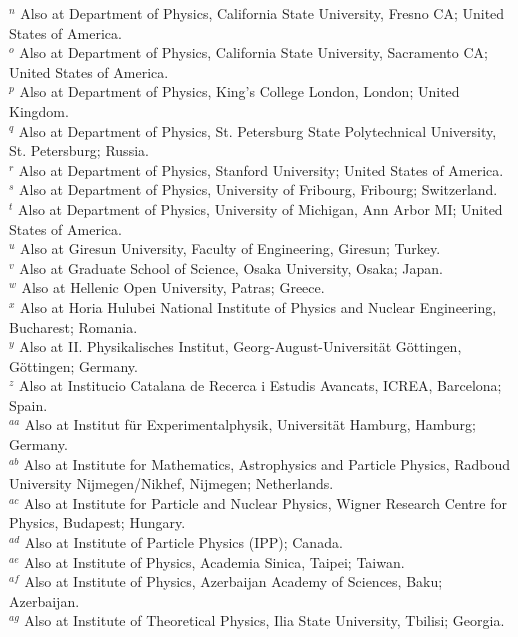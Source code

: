 \begin{flushleft}
$^{n}$ Also at Department of Physics, California State University, Fresno CA; United States of America.\\
$^{o}$ Also at Department of Physics, California State University, Sacramento CA; United States of America.\\
$^{p}$ Also at Department of Physics, King's College London, London; United Kingdom.\\
$^{q}$ Also at Department of Physics, St. Petersburg State Polytechnical University, St. Petersburg; Russia.\\
$^{r}$ Also at Department of Physics, Stanford University; United States of America.\\
$^{s}$ Also at Department of Physics, University of Fribourg, Fribourg; Switzerland.\\
$^{t}$ Also at Department of Physics, University of Michigan, Ann Arbor MI; United States of America.\\
$^{u}$ Also at Giresun University, Faculty of Engineering, Giresun; Turkey.\\
$^{v}$ Also at Graduate School of Science, Osaka University, Osaka; Japan.\\
$^{w}$ Also at Hellenic Open University, Patras; Greece.\\
$^{x}$ Also at Horia Hulubei National Institute of Physics and Nuclear Engineering, Bucharest; Romania.\\
$^{y}$ Also at II. Physikalisches Institut, Georg-August-Universit\"{a}t G\"ottingen, G\"ottingen; Germany.\\
$^{z}$ Also at Institucio Catalana de Recerca i Estudis Avancats, ICREA, Barcelona; Spain.\\
$^{aa}$ Also at Institut f\"{u}r Experimentalphysik, Universit\"{a}t Hamburg, Hamburg; Germany.\\
$^{ab}$ Also at Institute for Mathematics, Astrophysics and Particle Physics, Radboud University Nijmegen/Nikhef, Nijmegen; Netherlands.\\
$^{ac}$ Also at Institute for Particle and Nuclear Physics, Wigner Research Centre for Physics, Budapest; Hungary.\\
$^{ad}$ Also at Institute of Particle Physics (IPP); Canada.\\
$^{ae}$ Also at Institute of Physics, Academia Sinica, Taipei; Taiwan.\\
$^{af}$ Also at Institute of Physics, Azerbaijan Academy of Sciences, Baku; Azerbaijan.\\
$^{ag}$ Also at Institute of Theoretical Physics, Ilia State University, Tbilisi; Georgia.\\

\end{flushleft}
